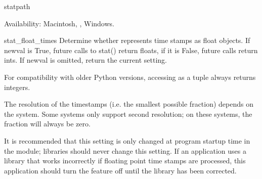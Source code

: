\begin{funcdesc}{stat}{path}

Availability: Macintosh, \UNIX, Windows.

\end{funcdesc}

\begin{funcdesc}{stat_float_times}{}
Determine whether  represents time stamps as float
objects.  If newval is True, future calls to stat() return floats, if
it is False, future calls return ints.  If newval is omitted, return
the current setting.

For compatibility with older Python versions, accessing
 as a tuple always returns integers.


The resolution of the timestamps (i.e. the smallest possible fraction)
depends on the system. Some systems only support second resolution;
on these systems, the fraction will always be zero.

It is recommended that this setting is only changed at program startup
time in the  module; libraries should never change this
setting. If an application uses a library that works incorrectly if
floating point time stamps are processed, this application should turn
the feature off until the library has been corrected.

\end{funcdesc}

